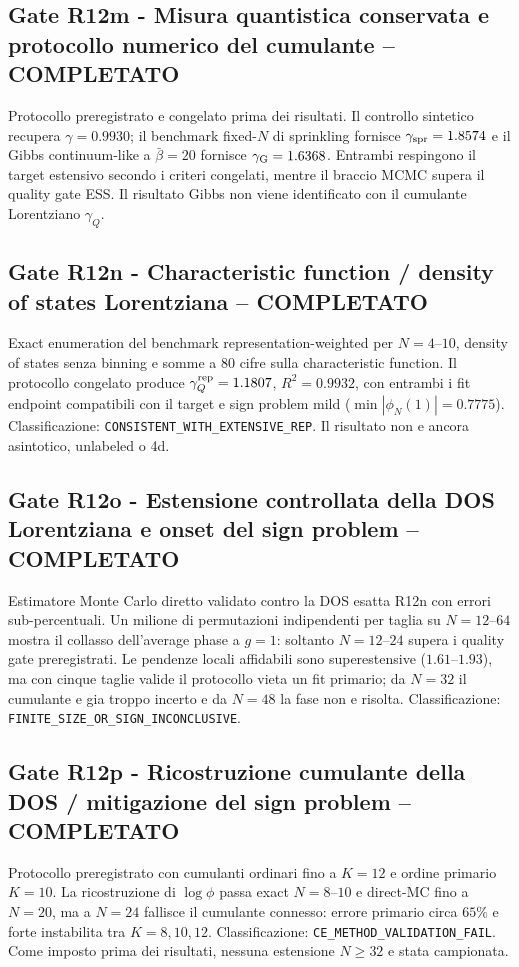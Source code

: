 \documentclass[11pt,a4paper]{article}
\begin{document}
\subsection*{Gate R12m - Misura quantistica conservata e protocollo numerico del cumulante -- COMPLETATO}
Protocollo preregistrato e congelato prima dei risultati. Il controllo sintetico recupera $\gamma=0.9930$; il benchmark fixed-$N$ di sprinkling fornisce $\gamma_{\rm spr}=1.8574$ e il Gibbs continuum-like a $\bar\beta=20$ fornisce $\gamma_{\rm G}=1.6368$. Entrambi respingono il target estensivo secondo i criteri congelati, mentre il braccio MCMC supera il quality gate ESS. Il risultato Gibbs non viene identificato con il cumulante Lorentziano $\gamma_Q$.

\subsection*{Gate R12n - Characteristic function / density of states Lorentziana -- COMPLETATO}
Exact enumeration del benchmark representation-weighted per $N=4$--$10$, density of states senza binning e somme a 80 cifre sulla characteristic function. Il protocollo congelato produce $\gamma_Q^{\rm rep}=1.1807$, $R^2=0.9932$, con entrambi i fit endpoint compatibili con il target e sign problem mild ($\min|\phi_N(1)|=0.7775$). Classificazione: \texttt{CONSISTENT\_WITH\_EXTENSIVE\_REP}. Il risultato non e ancora asintotico, unlabeled o 4d.

\subsection*{Gate R12o - Estensione controllata della DOS Lorentziana e onset del sign problem -- COMPLETATO}
Estimatore Monte Carlo diretto validato contro la DOS esatta R12n con errori sub-percentuali. Un milione di permutazioni indipendenti per taglia su $N=12$--$64$ mostra il collasso dell'average phase a $g=1$: soltanto $N=12$--$24$ supera i quality gate preregistrati. Le pendenze locali affidabili sono superestensive ($1.61$--$1.93$), ma con cinque taglie valide il protocollo vieta un fit primario; da $N=32$ il cumulante e gia troppo incerto e da $N=48$ la fase non e risolta. Classificazione: \texttt{FINITE\_SIZE\_OR\_SIGN\_INCONCLUSIVE}.

\subsection*{Gate R12p - Ricostruzione cumulante della DOS / mitigazione del sign problem -- COMPLETATO}
Protocollo preregistrato con cumulanti ordinari fino a $K=12$ e ordine primario $K=10$. La ricostruzione di $\log\phi$ passa exact $N=8$--$10$ e direct-MC fino a $N=20$, ma a $N=24$ fallisce il cumulante connesso: errore primario circa $65\%$ e forte instabilita tra $K=8,10,12$. Classificazione: \texttt{CE\_METHOD\_VALIDATION\_FAIL}. Come imposto prima dei risultati, nessuna estensione $N\ge32$ e stata campionata.
\end{document}
